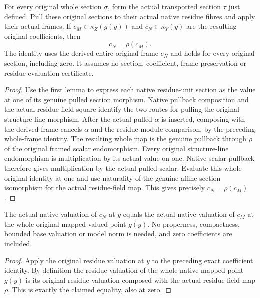 \begin{theorem}\label{thm:fc-native-framed-section-residue-transport}
\leanok
{}
For every original whole section $\sigma$, form the actual transported
section $\tau$ just defined. Pull these original sections to their
actual native residue fibres and apply their actual frames. If
$c_M\in\kappa_Z(g(y))$ and $c_N\in\kappa_Y(y)$ are the resulting
original coefficients, then
\[
 c_N=\rho(c_M).
\]
The identity uses the derived entire original frame $e_N$ and holds
for every original section, including zero. It assumes no section,
coefficient, frame-preservation or residue-evaluation certificate.
\end{theorem}
\begin{proof}
Use the first lemma to express each native residue-unit section as
the value at one of its genuine pulled section morphism. Native
pullback composition and the actual residue-field square identify
the two routes for pulling the original structure-line morphism.
After the actual pulled $\alpha$ is inserted, composing with the
derived frame cancels $\alpha$ and the residue-module comparison,
by the preceding whole-frame identity. The resulting whole map is
the genuine pullback through $\rho$ of the original framed scalar
endomorphism. Every original structure-line endomorphism is
multiplication by its actual value on one. Native scalar pullback
therefore gives multiplication by the actual pulled scalar.
Evaluate this whole original identity at one and use naturality of
the genuine affine section isomorphism for the actual residue-field
map. This gives precisely $c_N=\rho(c_M)$.
\end{proof}

\begin{corollary}\label{cor:fc-native-framed-section-valuation-transport}
\leanok
{}
The actual native valuation of $c_N$ at $y$ equals the actual native
valuation of $c_M$ at the whole original mapped valued point $g(y)$.
No properness, compactness, bounded base valuation or model norm is
needed, and zero coefficients are included.
\end{corollary}
\begin{proof}
Apply the original residue valuation at $y$ to the preceding exact
coefficient identity. By definition the residue valuation of the
whole native mapped point $g(y)$ is its original residue valuation
composed with the actual residue-field map $\rho$. This is exactly
the claimed equality, also at zero.
\end{proof}
